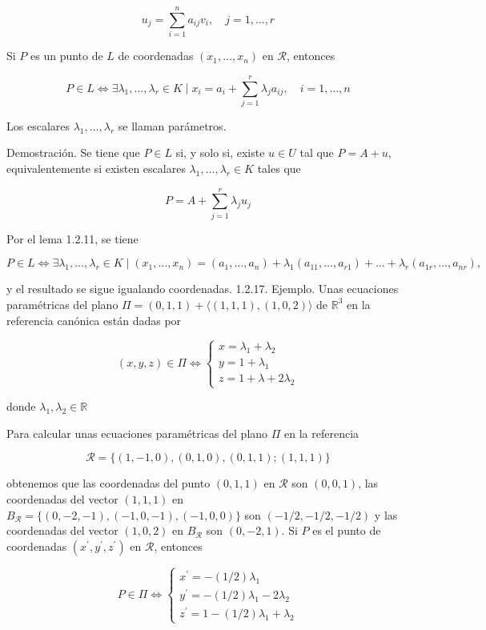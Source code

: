 \documentclass[12pt, a4paper, ones, notitlepage, openany,titlepage]{article}
\begin{document}
$$
u_{j}=\sum_{i=1}^{n} a_{i j} v_{i}, \quad j=1, \ldots, r
$$

Si $P$ es un punto de $L$ de coordenadas $\left(x_{1}, \ldots, x_{n}\right)$ en $\mathcal{R}$, entonces

$$
P \in L \Longleftrightarrow \exists \lambda_{1}, \ldots, \lambda_{r} \in K \mid x_{i}=a_{i}+\sum_{j=1}^{r} \lambda_{j} a_{i j}, \quad i=1, \ldots, n
$$

Los escalares $\lambda_{1}, \ldots, \lambda_{r}$ se llaman parámetros.

Demostración. Se tiene que $P \in L$ si, y solo si, existe $u \in U$ tal que $P=A+u$, equivalentemente si existen escalares $\lambda_{1}, \ldots, \lambda_{r} \in K$ tales que

$$
P=A+\sum_{j=1}^{r} \lambda_{j} u_{j}
$$

Por el lema 1.2.11, se tiene

$$
P \in L \Longleftrightarrow \exists \lambda_{1}, \ldots, \lambda_{r} \in K \mid\left(x_{1}, \ldots, x_{n}\right)=\left(a_{1}, \ldots, a_{n}\right)+\lambda_{1}\left(a_{11}, \ldots, a_{r 1}\right)+\ldots+\lambda_{r}\left(a_{1 r}, \ldots, a_{n r}\right),
$$

y el resultado se sigue igualando coordenadas. 1.2.17. Ejemplo. Unas ecuaciones paramétricas del plano $\Pi=(0,1,1)+\langle(1,1,1),(1,0,2)\rangle$ de $\mathbb{R}^{3}$ en la referencia canónica están dadas por

$$
(x, y, z) \in \Pi \Longleftrightarrow\left\{\begin{array}{l}
x=\lambda_{1}+\lambda_{2} \\
y=1+\lambda_{1} \\
z=1+\lambda+2 \lambda_{2}
\end{array}\right.
$$

donde $\lambda_{1}, \lambda_{2} \in \mathbb{R}$

Para calcular unas ecuaciones paramétricas del plano $\Pi$ en la referencia

$$
\mathcal{R}=\{(1,-1,0),(0,1,0),(0,1,1) ;(1,1,1)\}
$$

obtenemos que las coordenadas del punto $(0,1,1)$ en $\mathcal{R}$ son $(0,0,1)$, las coordenadas del vector $(1,1,1)$ en $B_{\mathcal{R}}=\{(0,-2,-1),(-1,0,-1),(-1,0,0)\}$ son $(-1 / 2,-1 / 2,-1 / 2)$ y las coordenadas del vector $(1,0,2)$ en $B_{\mathcal{R}}$ son $(0,-2,1)$. Si $P$ es el punto de coordenadas $\left(x^{\prime}, y^{\prime}, z^{\prime}\right)$ en $\mathcal{R}$, entonces

$$
P \in \Pi \Longleftrightarrow\left\{\begin{array}{l}
x^{\prime}=-(1 / 2) \lambda_{1} \\
y^{\prime}=-(1 / 2) \lambda_{1}-2 \lambda_{2} \\
z^{\prime}=1-(1 / 2) \lambda_{1}+\lambda_{2}
\end{array}\right.
$$
\end{document}
